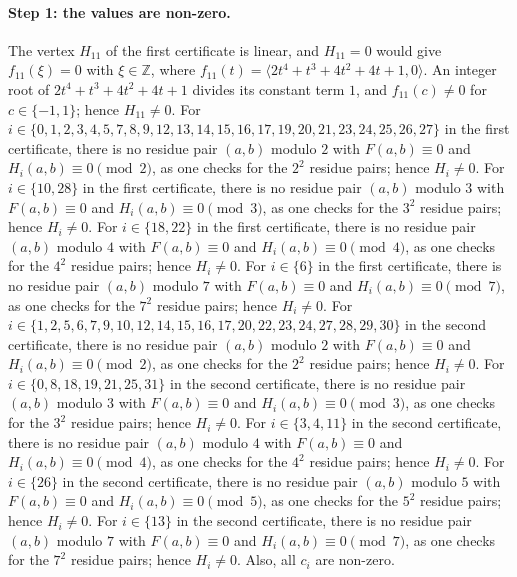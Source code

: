 \documentclass[11pt]{article}
\newcommand{\Z}{\mathbb{Z}}
\begin{document}
\paragraph{Step 1: the values are non-zero.} The vertex $H_{11}$ of the first certificate is linear, and $H_{11}=0$ would give $f_{11}(\xi)=0$ with $\xi\in\Z$, where $f_{11}(t)=\langle 2t^{4}+t^{3}+4t^{2}+4t+1,0\rangle$. An integer root of $2t^{4}+t^{3}+4t^{2}+4t+1$ divides its constant term $1$, and $f_{11}(c)\neq0$ for $c\in\{-1,1\}$; hence $H_{11}\neq0$. For $i\in\{0,\allowbreak 1,\allowbreak 2,\allowbreak 3,\allowbreak 4,\allowbreak 5,\allowbreak 7,\allowbreak 8,\allowbreak 9,\allowbreak 12,\allowbreak 13,\allowbreak 14,\allowbreak 15,\allowbreak 16,\allowbreak 17,\allowbreak 19,\allowbreak 20,\allowbreak 21,\allowbreak 23,\allowbreak 24,\allowbreak 25,\allowbreak 26,\allowbreak 27\}$ in the first certificate, there is no residue pair $(a,b)$ modulo $2$ with $F(a,b)\equiv0$ and $H_i(a,b)\equiv0\pmod{2}$, as one checks for the $2^2$ residue pairs; hence $H_i\neq0$. For $i\in\{10,\allowbreak 28\}$ in the first certificate, there is no residue pair $(a,b)$ modulo $3$ with $F(a,b)\equiv0$ and $H_i(a,b)\equiv0\pmod{3}$, as one checks for the $3^2$ residue pairs; hence $H_i\neq0$. For $i\in\{18,\allowbreak 22\}$ in the first certificate, there is no residue pair $(a,b)$ modulo $4$ with $F(a,b)\equiv0$ and $H_i(a,b)\equiv0\pmod{4}$, as one checks for the $4^2$ residue pairs; hence $H_i\neq0$. For $i\in\{6\}$ in the first certificate, there is no residue pair $(a,b)$ modulo $7$ with $F(a,b)\equiv0$ and $H_i(a,b)\equiv0\pmod{7}$, as one checks for the $7^2$ residue pairs; hence $H_i\neq0$. For $i\in\{1,\allowbreak 2,\allowbreak 5,\allowbreak 6,\allowbreak 7,\allowbreak 9,\allowbreak 10,\allowbreak 12,\allowbreak 14,\allowbreak 15,\allowbreak 16,\allowbreak 17,\allowbreak 20,\allowbreak 22,\allowbreak 23,\allowbreak 24,\allowbreak 27,\allowbreak 28,\allowbreak 29,\allowbreak 30\}$ in the second certificate, there is no residue pair $(a,b)$ modulo $2$ with $F(a,b)\equiv0$ and $H_i(a,b)\equiv0\pmod{2}$, as one checks for the $2^2$ residue pairs; hence $H_i\neq0$. For $i\in\{0,\allowbreak 8,\allowbreak 18,\allowbreak 19,\allowbreak 21,\allowbreak 25,\allowbreak 31\}$ in the second certificate, there is no residue pair $(a,b)$ modulo $3$ with $F(a,b)\equiv0$ and $H_i(a,b)\equiv0\pmod{3}$, as one checks for the $3^2$ residue pairs; hence $H_i\neq0$. For $i\in\{3,\allowbreak 4,\allowbreak 11\}$ in the second certificate, there is no residue pair $(a,b)$ modulo $4$ with $F(a,b)\equiv0$ and $H_i(a,b)\equiv0\pmod{4}$, as one checks for the $4^2$ residue pairs; hence $H_i\neq0$. For $i\in\{26\}$ in the second certificate, there is no residue pair $(a,b)$ modulo $5$ with $F(a,b)\equiv0$ and $H_i(a,b)\equiv0\pmod{5}$, as one checks for the $5^2$ residue pairs; hence $H_i\neq0$. For $i\in\{13\}$ in the second certificate, there is no residue pair $(a,b)$ modulo $7$ with $F(a,b)\equiv0$ and $H_i(a,b)\equiv0\pmod{7}$, as one checks for the $7^2$ residue pairs; hence $H_i\neq0$. Also, all $c_i$ are non-zero.
\end{document}
